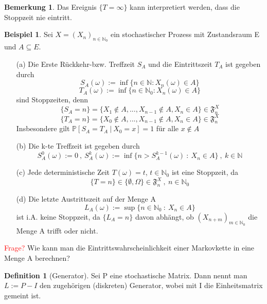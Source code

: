 \documentclass[a4paper,12pt]{scrartcl}
\theoremstyle{definition}
\newtheorem{bem}{Bemerkung}[section]
\newtheorem{bsp}{Beispiel}[section]
\newtheorem{defi}{Definition}[section]
\begin{document}
\begin{bem}
Das Ereignis $\lbrace T = \infty \rbrace$ kann interpretiert werden, dass die Stoppzeit nie eintritt.  
\end{bem}
\begin{bsp}
Sei $X=(X_{n})_{n \in \mathbb{N}_{0}}$ ein stochastischer Prozess mit Zustandsraum E und $A \subseteq E$.
\begin{itemize}
\item[(a)] Die Erste Rückkehr-bzw. Treffzeit $S_{A}$ und die Eintrittszeit $T_{A}$ ist gegeben durch 
\begin{equation*}
S_{A}(\omega) := \inf \lbrace n \in \mathbb{N} : X_{n}(\omega) \in A \rbrace
\end{equation*}
\begin{equation*}
T_{A}(\omega) := \inf \lbrace n \in \mathbb{N}_{0} : X_{n}(\omega) \in A \rbrace
\end{equation*}
sind Stoppzeiten, denn
\begin{equation*}
\lbrace S_{A} = n \rbrace = \lbrace X_{1} \notin A,...,X_{n-1} \notin A, X_{n} \in A  \rbrace \in \mathfrak{F}_{n}^{X}
\end{equation*}
\begin{equation*}
\lbrace T_{A} = n \rbrace = \lbrace X_{0} \notin A,...,X_{n-1} \notin A, X_{n} \in A  \rbrace \in \mathfrak{F}_{n}^{X}
\end{equation*}
Insbesondere gilt $\mathbb{P}[S_{A} = T_{A} \: | \: X_{0} = x] = 1$ für alle $x \notin A$
\item[(b)] Die k-te Treffzeit ist gegeben durch 
\begin{equation*}
S_{A}^{0}(\omega) := 0 \: , \: S_{A}^{k}(\omega) := \inf \lbrace n> S_{A}^{k-1}(\omega) \: : \: X_{n} \in A \rbrace \: , \: k \in \mathbb{N}
\end{equation*}
\item[(c)] Jede deterministische Zeit $T(\omega) = t$, $t \in \mathbb{N}_{0}$ ist eine Stoppzeit, da
\begin{equation*}
\lbrace T = n \rbrace \in \lbrace \emptyset, \Omega \rbrace  \in \mathfrak{F}_{n}^{X} \:,\: n \in \mathbb{N}_{0} 
\end{equation*}
\item[(d)] Die letzte Austrittszeit auf der Menge A 
\begin{equation*}
L_{A}(\omega) := \sup \lbrace n \in \mathbb{N}_{0} \: : \: X_{n} \in A \rbrace
\end{equation*}
ist i.A. keine Stoppzeit, da $\lbrace L_{A} = n \rbrace$ davon abhängt, ob $(X_{n+m})_{m \in \mathbb{N}_{0}}$ die Menge A trifft oder nicht.
\end{itemize}
\end{bsp}
\noindent
\textcolor{red}{Frage?} Wie kann man die Eintrittswahrscheinlichkeit einer Markovkette in eine Menge A berechnen?
\begin{defi}[Generator]
Sei P eine stochastische Matrix. Dann nennt man $L := P-I$ den zugehörigen (diskreten) Generator, wobei mit I die Einheitsmatrix gemeint ist.
\end{defi}
\end{document}
